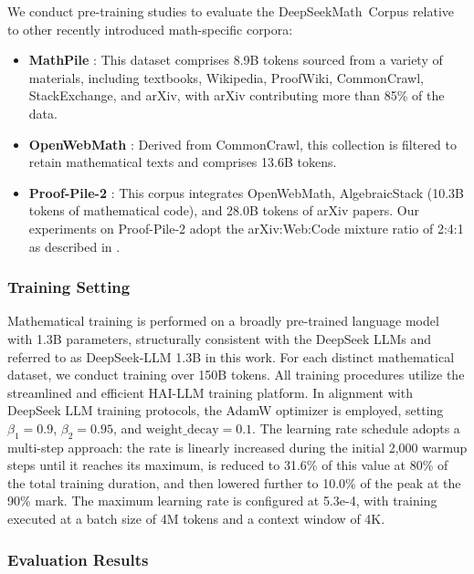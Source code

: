\begin{itemize}[topsep=0pt]
We conduct pre-training studies to evaluate the DeepSeekMath~Corpus relative to other recently introduced math-specific corpora:

\begin{itemize}[topsep=0pt]
    \item \textbf{MathPile} \citep{mathpile}: This dataset comprises 8.9B tokens sourced from a variety of materials, including textbooks, Wikipedia, ProofWiki, CommonCrawl, StackExchange, and arXiv, with arXiv contributing more than 85\% of the data.
    \item \textbf{OpenWebMath} \citep{openwebmath}: Derived from CommonCrawl, this collection is filtered to retain mathematical texts and comprises 13.6B tokens.
    \item \textbf{Proof-Pile-2} \citep{llemma}: This corpus integrates OpenWebMath, AlgebraicStack (10.3B tokens of mathematical code), and 28.0B tokens of arXiv papers. Our experiments on Proof-Pile-2 adopt the arXiv:Web:Code mixture ratio of 2:4:1 as described in \cite{llemma}.
\end{itemize}

\subsubsection{Training Setting}
\label{sec:quality-policy}
Mathematical training is performed on a broadly pre-trained language model with 1.3B parameters, structurally consistent with the DeepSeek LLMs \citep{deepseek-llm} and referred to as DeepSeek-LLM 1.3B in this work. For each distinct mathematical dataset, we conduct training over 150B tokens. All training procedures utilize the streamlined and efficient HAI-LLM \citep{haillm} training platform. In alignment with DeepSeek LLM training protocols, the AdamW optimizer \citep{adamW} is employed, setting $\beta_1=0.9$, $\beta_2=0.95$, and $\mathrm{weight\_decay}=0.1$. The learning rate schedule adopts a multi-step approach: the rate is linearly increased during the initial 2,000 warmup steps until it reaches its maximum, is reduced to 31.6\% of this value at 80\% of the total training duration, and then lowered further to 10.0\% of the peak at the 90\% mark. The maximum learning rate is configured at 5.3e-4, with training executed at a batch size of 4M tokens and a context window of 4K.

\subsubsection{Evaluation Results}


\end{itemize}

